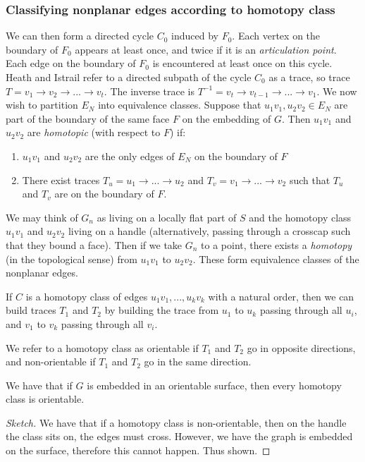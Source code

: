 \subsubsection{Classifying nonplanar edges according to homotopy class}

We can then form a directed cycle \(C_0\) induced by \(F_0\). Each vertex on the boundary of \(F_0\) appears at least once, and twice if it is an \textit{articulation point}. Each edge on the boundary of \(F_0\) is encountered at least once on this cycle. Heath and Istrail refer to a directed subpath of the cycle \(C_0\) as a trace, so trace \(T = v_1 \rightarrow v_2 \rightarrow ... \rightarrow v_t\). The inverse trace is \(T^{-1} = v_t \rightarrow v_{t-1} \rightarrow ... \rightarrow v_1\). We now wish to partition \(E_N\) into equivalence classes. Suppose that \(u_1v_1, u_2v_2 \in E_N\) are part of the boundary of the same face \(F\) on the embedding of \(G\). Then \(u_1v_1\) and \(u_2v_2\) are \textit{homotopic} (with respect to \(F\)) if:
\begin{enumerate}
	\item \(u_1v_1\) and \(u_2v_2\) are the only edges of \(E_N\) on the boundary of \(F\)
	\item There exist traces \(T_u = u_1 \rightarrow ... \rightarrow u_2\) and \(T_v = v_1 \rightarrow ... \rightarrow v_2\) such that \(T_u\) and \(T_v\) are on the boundary of \(F\).
\end{enumerate}
We may think of \(G_n\) as living on a locally flat part of \(S\) and the homotopy class \(u_1v_1\) and \(u_2 v_2\) living on a handle (alternatively, passing through a crosscap such that they bound a face). Then if we take \(G_n\) to a point, there exists a \textit{homotopy} (in the topological sense) from \(u_1v_1\) to \(u_2v_2\). These form equivalence classes of the nonplanar edges.

\begin{lemma}
	If \(C\) is a homotopy class of edges \(u_1v_1, ..., u_kv_k\) with a natural order, then we can build traces \(T_1\) and \(T_2\) by building the trace from \(u_1\) to \(u_k\) passing through all \(u_i\), and \(v_1\) to \(v_k\) passing through all \(v_i\). 
\end{lemma}
We refer to a homotopy class as orientable if \(T_1\) and \(T_2\) go in opposite directions, and non-orientable if \(T_1\) and \(T_2\) go in the same direction.

\begin{lemma}
	We have that if \(G\) is embedded in an orientable surface, then every homotopy class is orientable.
\end{lemma}
\begin{proof}[Sketch]
	We have that if a homotopy class is non-orientable, then on the handle the class sits on, the edges must cross. However, we have the graph is embedded on the surface, therefore this cannot happen. Thus shown. 
\end{proof}

